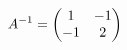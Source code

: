 \documentclass[preview]{standalone}
\begin{document}
\begin{align*}
\special{dvisvgm:raw <g id='unique000'>}A^{-1}=\begin{pmatrix}1&-1\\-1&2\end{pmatrix}\special{dvisvgm:raw </g>}
\end{align*}
\end{document}
